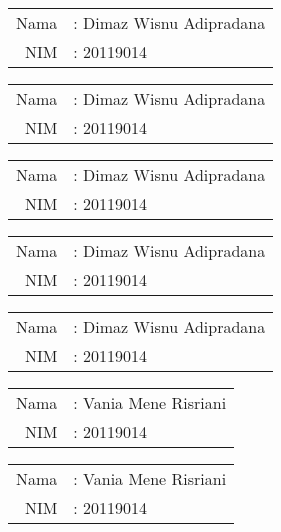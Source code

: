 \documentclass[11pt,a4paper]{article}
\theoremstyle{plain}
\theoremstyle{definition}
\theoremstyle{remark}
\begin{document}
\newpage
 
\begin{flushright}
	\begin{tabular}{rl}
		Nama &: Dimaz Wisnu Adipradana\\
		NIM  &: 20119014 
	\end{tabular}
\end{flushright}


\newpage
 
\begin{flushright}
	\begin{tabular}{rl}
		Nama &: Dimaz Wisnu Adipradana\\
		NIM  &: 20119014 
	\end{tabular}
\end{flushright}

\newpage
 
\begin{flushright}
	\begin{tabular}{rl}
		Nama &: Dimaz Wisnu Adipradana\\
		NIM  &: 20119014 
	\end{tabular}
\end{flushright}

\newpage
 
\begin{flushright}
	\begin{tabular}{rl}
		Nama &: Dimaz Wisnu Adipradana\\
		NIM  &: 20119014 
	\end{tabular}
\end{flushright}

\newpage
 
\begin{flushright}
	\begin{tabular}{rl}
		Nama &: Dimaz Wisnu Adipradana\\
		NIM  &: 20119014 
	\end{tabular}
\end{flushright}


\newpage
 
\begin{flushright}
	\begin{tabular}{rl}
		Nama &: Vania Mene Risriani\\
		NIM  &: 20119014 
	\end{tabular}
\end{flushright}


\newpage
 
\begin{flushright}
	\begin{tabular}{rl}
		Nama &: Vania Mene Risriani\\
		NIM  &: 20119014 
	\end{tabular}
\end{flushright}
\end{document}
